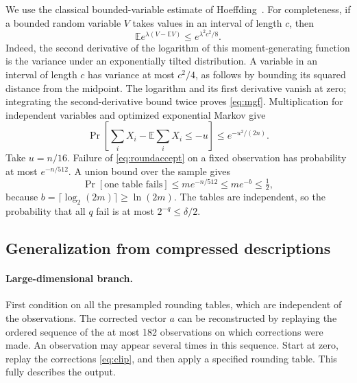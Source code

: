 \documentclass[11pt,a4paper]{article}
\theoremstyle{remark}
\newcommand{\1}{\mathbf 1}
\begin{document}
We use the classical bounded-variable estimate of Hoeffding~\cite{hoeffding1963}.
For completeness, if a bounded random variable $V$ takes values in an interval
of length $c$, then
\begin{equation}\label{eq:mgf}
 \mathbb E e^{\lambda(V-\mathbb EV)}
 \le e^{\lambda^2c^2/8}.
\end{equation}
Indeed, the second derivative of the logarithm of this moment-generating
function is the variance under an exponentially tilted distribution. A
variable in an interval of length $c$ has variance at most $c^2/4$, as follows
by bounding its squared distance from the midpoint. The logarithm and its first
derivative vanish at zero; integrating the second-derivative bound twice proves
\eqref{eq:mgf}. Multiplication for independent variables and optimized
exponential Markov give
\[
 \Pr\!\left[\sum_i X_i-\mathbb E\sum_i X_i\le-u\right]
 \le e^{-u^2/(2n)}.
\]
Take $u=n/16$. Failure of \eqref{eq:roundaccept} on a fixed observation has
probability at most $e^{-n/512}$. A union bound over the sample gives
\[
 \Pr[\text{one table fails}]
 \le me^{-n/512}\le me^{-b}\le\tfrac12,
\]
because $b=\lceil\log_2(2m)\rceil\ge\ln(2m)$. The tables are independent, so
the probability that all $q$ fail is at most $2^{-q}\le\delta/2$.

\subsection{Generalization from compressed descriptions}

\paragraph{Large-dimensional branch.}
First condition on all the presampled rounding tables, which are independent
of the observations. The corrected vector $a$ can be reconstructed by replaying
the ordered sequence of the at most 182 observations on which corrections
were made. An observation may appear several times in this sequence.
Start at zero, replay the corrections \eqref{eq:clip}, and then apply a
specified rounding table. This fully describes the output.
\end{document}
